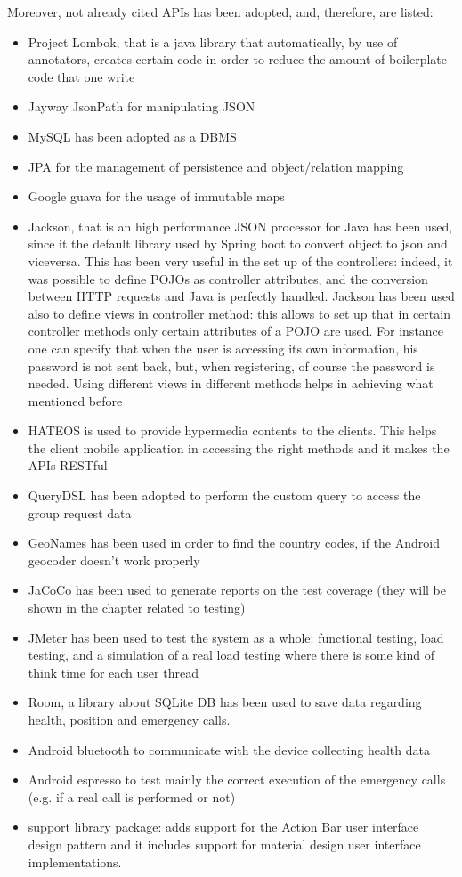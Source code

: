Moreover, not already cited APIs has been adopted, and, therefore, are listed: 

\begin{itemize}
\item Project Lombok, that is a java library that automatically, by use of annotators, creates certain code in order to reduce the amount
of boilerplate code that one write 
\item Jayway JsonPath for manipulating JSON 
\item MySQL has been adopted as a DBMS
\item JPA for the management of persistence and object/relation mapping
\item Google guava for the usage of immutable maps
\item Jackson, that is an high performance JSON processor for Java has been used, since it the default library used by Spring boot 
to convert object to json and viceversa. 
This has been very useful in the set up of the controllers: indeed, it was possible to define POJOs as controller attributes, and the conversion between HTTP requests and Java is perfectly handled. 
Jackson has been used also to define views in controller method: this allows to set up that in certain controller methods only certain attributes of a POJO are used. 
For instance one can specify that when the user is accessing its own information, his password is not sent back, but, when registering, of course the password is needed.
Using different views in different methods helps in achieving what mentioned before
\item HATEOS is used to provide hypermedia contents to the clients. This helps the client mobile application in accessing the right methods 
and it makes the APIs RESTful
\item QueryDSL has been adopted to perform the custom query to access the group request data
\item GeoNames has been used in order to find the country codes, if the Android geocoder doesn't work properly
\item JaCoCo has been used to generate reports on the test coverage (they will be shown in the chapter related to testing)
\item JMeter has been used to test the system as a whole: functional testing, load testing, and a simulation of a real load testing where there is some kind of think time for each user thread
\item Room, a library about SQLite DB has been used to save data regarding health, position and emergency calls.
\item Android bluetooth to communicate with the device collecting health data
\item Android espresso to test mainly the correct execution of the emergency calls (e.g. if a real call is performed or not)
\item support library package: adds support for the Action Bar user interface design pattern and it includes support for material design user interface implementations. 
\end{itemize}
